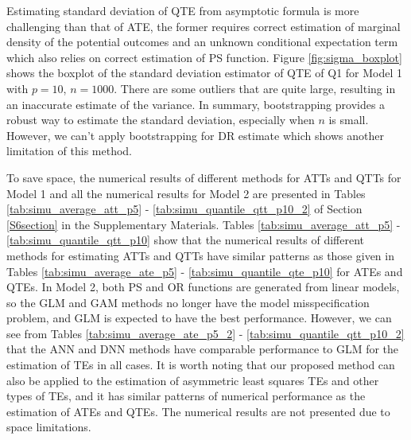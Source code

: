 \documentclass[11pt]{article}
\numberwithin{equation}{section}
\begin{document}
Estimating standard deviation of QTE from asymptotic formula is more challenging than that of ATE, the former requires correct estimation of marginal density of the potential outcomes and an unknown conditional expectation term which also relies on correct estimation of PS function. Figure \ref{fig:sigma_boxplot} shows the boxplot of the standard deviation estimator of QTE of Q1 for Model 1 with $p=10$, $n=1000$. There are some outliers that are quite large, resulting in an inaccurate estimate of the variance. In summary, bootstrapping provides a robust way to estimate the standard deviation, especially when $n$ is small. However, we can't apply bootstrapping for DR estimate which shows another limitation of this method.
\fi

To save space, the numerical results of different methods for ATTs and QTTs for Model 1 and all the numerical results for Model 2 are presented in Tables \ref{tab:simu_average_att_p5} - \ref{tab:simu_quantile_qtt_p10_2} of Section \ref{S6section} in the Supplementary Materials.  Tables \ref{tab:simu_average_att_p5} - \ref{tab:simu_quantile_qtt_p10} show that the numerical results of different methods for estimating ATTs and QTTs have similar patterns as those given in Tables  \ref{tab:simu_average_ate_p5} -  \ref{tab:simu_quantile_qte_p10} for ATEs and QTEs. In Model 2, both PS and OR functions are generated from linear models, so the GLM and GAM methods no longer have the model misspecification problem, and GLM is expected to have the best performance. However, we can see from Tables \ref{tab:simu_average_ate_p5_2} - \ref{tab:simu_quantile_qtt_p10_2} that the ANN and DNN methods have comparable performance to GLM for the estimation of TEs in all cases. It is worth noting that  our proposed method can also be applied to the estimation of  asymmetric least squares TEs and other types of TEs, and it has similar patterns of numerical performance as the estimation of ATEs and QTEs. The numerical results are not presented due to space limitations.
\end{document}
